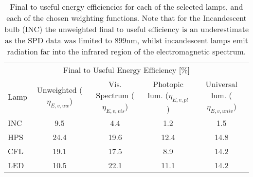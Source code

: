 

\begin{table}
\centering %
\caption{Final to useful energy efficiencies for each of the selected lamps, and each of the chosen weighting functions. Note that for the Incandescent bulb (INC) the unweighted final to useful efficiency is an underestimate as the SPD data was limited to 899nm, whilst incandescent lamps emit radiation far into the infrared region of the electromagnetic spectrum.}
\begin{tabular}{l c c c c}
\hline
\multicolumn{5}{c}{Final to Useful Energy Efficiency [\%]} \\
\cline{2-5}
  Lamp 
      & Unweighted ($\eta_{E,v,uw}$)
      & Vis. Spectrum ($\eta_{E,v,vis}$)
      & Photopic lum. ($\eta_{E,v,pl}$)
      & Universal lum. ($\eta_{E,v,univ}$)  \\
\hline
  INC & 9.5 & 4.4 & 1.2 & 1.5 \\
  HPS & 24.4 & 19.6 & 12.4 & 14.8 \\
  CFL & 19.1 & 17.5 & 8.9 & 14.2 \\
  LED & 10.5 & 22.1 & 11.1 & 14.2 \\
\hline
\end{tabular}
\label{tab:results_etas}
\end{table}

